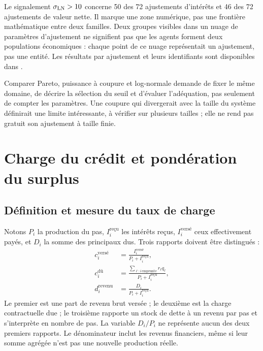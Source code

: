 Le signalement $\sigma_{\rm LN}>10$ concerne 50 des 72 ajustements
d'intérêts et 46 des 72 ajustements de valeur nette. Il marque une
zone numérique, pas une frontière mathématique entre deux familles.
Deux groupes visibles dans un nuage de paramètres d'ajustement ne
signifient pas que les agents forment deux populations économiques :
chaque point de ce nuage représentait un ajustement, pas une entité.
Les résultats par ajustement et leurs identifiants sont disponibles dans
.

Comparer Pareto, puissance à coupure et log-normale demande de
fixer le même domaine, de décrire la sélection du seuil et d'évaluer
l'adéquation, pas seulement de compter les paramètres. Une coupure
qui divergerait avec la taille du système définirait une limite
intéressante, à vérifier sur plusieurs tailles ; elle ne rend pas
gratuit son ajustement à taille finie.

\section{Charge du crédit et pondération du surplus}
\subsection{Définition et mesure du taux de charge}\label{sec:charge}
Notons $P_i$ la production du pas, $I_i^{\text{reçu}}$ les intérêts
reçus, $I_i^{\text{versé}}$ ceux effectivement payés, et $D_i$ la
somme des principaux dus. Trois rapports doivent être distingués :
\begin{align*}
 c_i^{\text{versé}}&=\frac{I_i^{\text{versé}}}{P_i+I_i^{\text{reçu}}},\\
 c_i^{\text{dû}}&=\frac{\sum_{\ell:i\,\mathrm{emprunte}}r_\ell q_\ell}{P_i+I_i^{\text{reçu}}},\\
 d_i^{\text{revenu}}&=\frac{D_i}{P_i+I_i^{\text{reçu}}}.
\end{align*}
Le premier est une part de revenu brut versée ; le deuxième est la
charge contractuelle due ; le troisième rapporte un stock de dette
à un revenu par pas et s'interprète en nombre de pas. La
variable $D_i/P_i$ ne représente aucun des deux premiers rapports.
Le dénominateur inclut les revenus financiers, même si leur
somme agrégée n'est pas une nouvelle production réelle.


